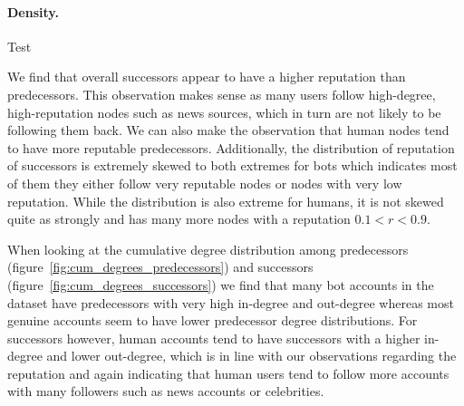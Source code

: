 \paragraph{Density.} Test

\bigskip

We find that overall successors appear to have a higher reputation than predecessors. This observation makes sense as many users follow high-degree, high-reputation nodes such as news sources, which in turn are not likely to be following them back. We can also make the observation that human nodes tend to have more reputable predecessors. Additionally, the distribution of reputation of successors is extremely skewed to both extremes for bots which indicates most of them they either follow very reputable nodes or nodes with very low reputation. While the distribution is also extreme for humans, it is not skewed quite as strongly and has many more nodes with a reputation $0.1 < r < 0.9$.

When looking at the cumulative degree distribution among predecessors (figure~\ref{fig:cum_degrees_predecessors}) and successors (figure~\ref{fig:cum_degrees_successors}) we find that many bot accounts in the dataset have predecessors with very high in-degree and out-degree whereas most genuine accounts seem to have lower predecessor degree distributions. For successors however, human accounts tend to have successors with a higher in-degree and lower out-degree, which is in line with our observations regarding the reputation and again indicating that human users tend to follow more accounts with many followers such as news accounts or celebrities. 

